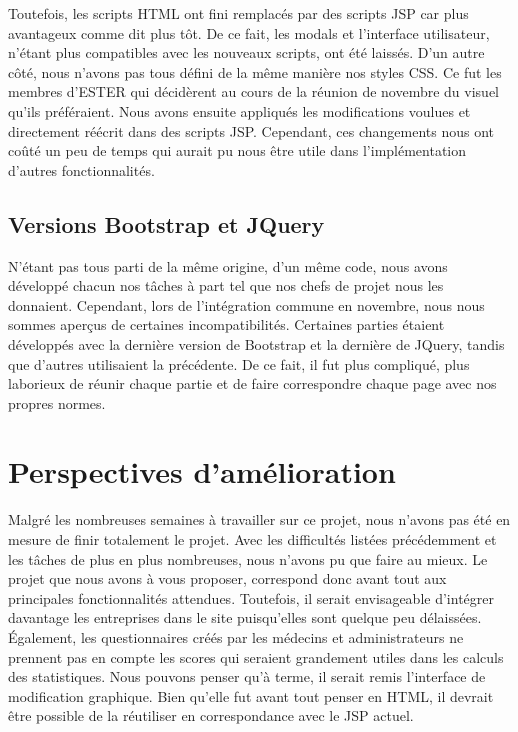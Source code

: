 Toutefois, les scripts HTML ont fini remplacés par des scripts JSP car plus avantageux comme dit plus tôt. De ce fait, les modals et l'interface utilisateur, n'étant plus compatibles avec les nouveaux scripts, ont été laissés. D'un autre côté, nous n'avons pas tous défini de la même manière nos styles CSS. Ce fut les membres d'ESTER qui décidèrent au cours de la réunion de novembre du visuel qu'ils préféraient. Nous avons ensuite appliqués les modifications voulues et directement réécrit dans des scripts JSP. Cependant, ces changements nous ont coûté un peu de temps qui aurait pu nous être utile dans l'implémentation d'autres fonctionnalités.

\subsection{Versions Bootstrap et JQuery}

N'étant pas tous parti de la même origine, d'un même code, nous avons développé chacun nos tâches à part tel que nos chefs de projet nous les donnaient. Cependant, lors de l'intégration commune en novembre, nous nous sommes aperçus de certaines incompatibilités. Certaines parties étaient développés avec la dernière version de Bootstrap et la dernière de JQuery, tandis que d'autres utilisaient la précédente. 
De ce fait, il fut plus compliqué, plus laborieux de réunir chaque partie et de faire correspondre chaque page avec nos propres normes. 


\section{Perspectives d'amélioration}

Malgré les nombreuses semaines à travailler sur ce projet, nous n'avons pas été en mesure de finir totalement le projet. Avec les difficultés listées précédemment et les tâches de plus en plus nombreuses, nous n'avons pu que faire au mieux. 
Le projet que nous avons à vous proposer, correspond donc avant tout aux principales fonctionnalités attendues. Toutefois, il serait envisageable d'intégrer davantage les entreprises dans le site puisqu'elles sont quelque peu délaissées. 
Également, les questionnaires créés par les médecins et administrateurs ne prennent pas en compte les scores qui seraient grandement utiles dans les calculs des statistiques. 
Nous pouvons penser qu'à terme, il serait remis l'interface de modification graphique. Bien qu'elle fut avant tout penser en HTML, il devrait être possible de la réutiliser en correspondance avec le JSP actuel. 
